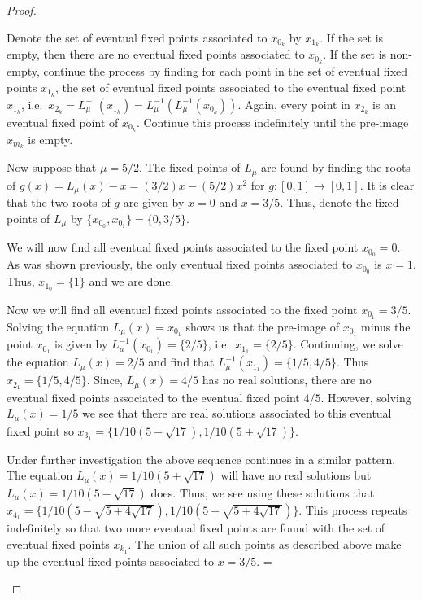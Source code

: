 \begin{proof}
\begin{enumerate}
      Denote the set of eventual fixed points associated to $x_{0_k}$ by $x_{1_k}$.
      If the set is empty, then there are no eventual fixed points associated to $x_{0_k}$.
      If the set is non-empty, continue the process by finding for each point in
      the set of eventual fixed points $x_{1_k}$, the set
      of eventual fixed points associated to the eventual fixed point $x_{1_k}$,
      i.e.\ $x_{2_k} = L_\mu^{-1}\left(x_{1_k}\right) = L_\mu^{-1}\left(L_\mu^{-1}\left(x_{0_k}\right)\right)$.
      Again, every point in $x_{2_k}$ is an eventual fixed point of $x_{0_k}$.
      Continue this process indefinitely until the pre-image $x_{m_k}$ is empty.

      Now suppose that $\mu = 5/2$. The fixed points of $L_\mu$ are found by finding
      the roots of $g(x) = L_\mu(x) - x = (3/2)x - (5/2)x^2$ for $g:[0, 1] \to [0, 1]$.
      It is clear that the two roots of $g$ are given by $x=0$
      and $x =3/5$. Thus, denote the fixed points of $L_\mu$ by $\{x_{0_0}, x_{0_1}\} = \{0, 3/5\}$.

      We will now find all eventual fixed points associated to the fixed point
      $x_{0_0} = 0$. As was shown previously, the only eventual fixed points associated to
      $x_{0_0}$ is $x = 1$. Thus, $x_{1_0} = \{1\}$ and we are done.

      Now we will find all eventual fixed points associated to the fixed point
      $x_{0_1} = 3/5$.  Solving the equation $L_\mu(x) = x_{0_1}$ shows us that the pre-image
      of $x_{0_1}$ minus the point $x_{0_1}$ is given by $L_\mu^{-1}\left(x_{0_1}\right) = \{2/5 \}$, i.e.\
      $x_{1_1} = \{2/5\}$. Continuing, we solve the equation $L_\mu(x) = 2/5$ and find that
      $L_\mu^{-1}(x_{1_1}) = \{1/5, 4/5\}$. Thus $x_{2_1} = \{1/5, 4/5\}$.
      Since, $L_\mu(x) =  4/5$ has no real solutions, there are no eventual fixed points associated to the eventual fixed point $4/5$.
      However, solving $L_\mu(x) =  1/5$ we see that there are real solutions associated to this eventual fixed point
      so $x_{3_1} = \{1/10 (5 - \sqrt{17}), 1/10 (5 + \sqrt{17})\}$.

      Under further investigation the above sequence continues in a similar pattern. The equation
      $L_\mu(x) =  1/10 (5 + \sqrt{17})$ will have no real solutions but
      $L_\mu(x) =  1/10 (5 - \sqrt{17})$ does. Thus, we see using these solutions that
      $x_{4_1} = \{1/10 (5 - \sqrt{5 + 4 \sqrt{17}}), 1/10 (5 +  \sqrt{5 + 4 \sqrt{17}})\}$.
      This process repeats indefinitely
      so that two more eventual fixed points are found with the set of eventual fixed points $x_{k_1}$.
      The union of all such points as described above  make up the eventual
      fixed points associated to $x = 3/5$.
=
  \end{enumerate}
\end{proof}
\newpage

